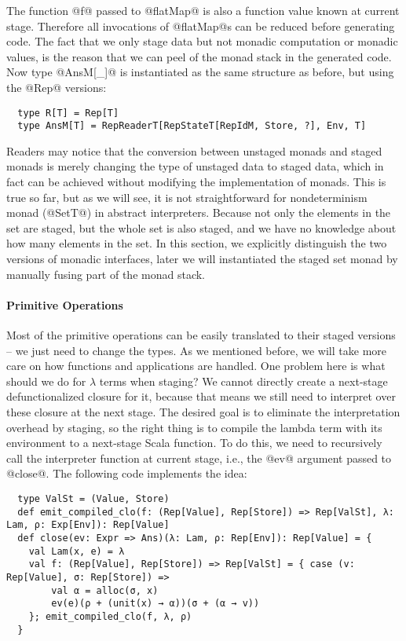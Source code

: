 The function @f@ passed to @flatMap@ is also a function value known at current stage.
Therefore all invocations of @flatMap@s can be reduced before generating code.
The fact that we only stage data but not monadic computation or monadic
values, is the reason that we can peel of the monad stack in the generated code.
Now type @AnsM[_]@ is instantiated as the same structure as before, but using the
@Rep@ versions:
\begin{lstlisting}
  type R[T] = Rep[T]
  type AnsM[T] = RepReaderT[RepStateT[RepIdM, Store, ?], Env, T]
\end{lstlisting}

Readers may notice that the conversion between unstaged monads and staged monads
is merely changing the type of unstaged data to staged data, which in fact can
be achieved without modifying the implementation of monads. This is true so far,
but as we will see, it is not straightforward for nondeterminism monad
(@SetT@) in abstract interpreters. Because not only the elements in the set are
staged, but the whole set is also staged, and we have no knowledge about how
many elements in the set. In this section, we explicitly distinguish the two
versions of monadic interfaces, later we will instantiated the staged set monad
by manually fusing part of the monad stack.

\paragraph{Primitive Operations} Most of the primitive operations can be easily
translated to their staged versions -- we just need to change the types.
As we mentioned before, we will take more care on how functions and
applications are handled.  One problem here is what should we do for
$\lambda$ terms when staging? We cannot directly create a next-stage
defunctionalized closure for it, because that means we still need to
interpret over these closure at the next stage.  The desired goal is to
eliminate the interpretation overhead by staging, so the right thing is to
compile the lambda term with its environment to a next-stage Scala function. To
do this, we need to recursively call the interpreter function at current stage,
i.e., the @ev@ argument passed to @close@.  The following code implements the
idea:
\begin{lstlisting}
  type ValSt = (Value, Store)
  def emit_compiled_clo(f: (Rep[Value], Rep[Store]) => Rep[ValSt], λ: Lam, ρ: Exp[Env]): Rep[Value]
  def close(ev: Expr => Ans)(λ: Lam, ρ: Rep[Env]): Rep[Value] = {
    val Lam(x, e) = λ
    val f: (Rep[Value], Rep[Store]) => Rep[ValSt] = { case (v: Rep[Value], σ: Rep[Store]) =>
        val α = alloc(σ, x)
        ev(e)(ρ + (unit(x) → α))(σ + (α → v))
    }; emit_compiled_clo(f, λ, ρ)
  }
\end{lstlisting}

